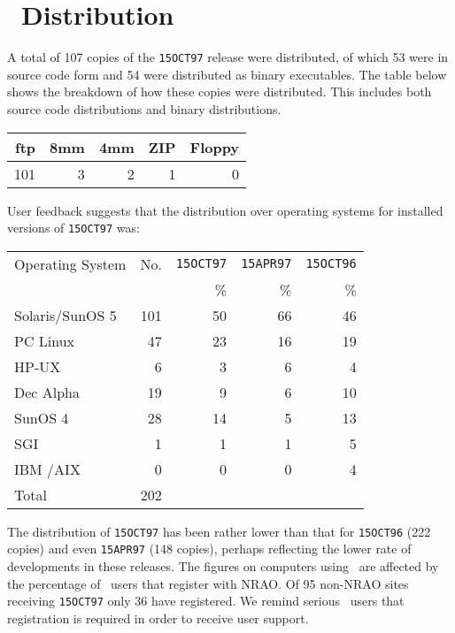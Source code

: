 \section{\AIPS\ Distribution}

A total of 107 copies of the \texttt{15OCT97} release were
distributed, of which 53 were in source code form and 54 were
distributed as binary executables.  The table below shows the
breakdown of how these copies were distributed. This includes both
source code distributions and binary distributions.

\begin{center}
\begin{tabular}{|r|r|r|r|r|} \hline\hline
{ftp} & {8mm} & {4mm} & {ZIP} & {Floppy} \\ \hline
101   &    3  &    2  &    1  &       0  \\ \hline\hline
\end{tabular}
\end{center}

User feedback suggests that the distribution over operating systems
for installed versions of \texttt{15OCT97} was:

\begin{center}
\begin{tabular}{|l|r|r|r|r|} \hline\hline
{Operating System} & {No.} & \texttt{15OCT97}  & \texttt{15APR97}  &
                                        \texttt{15OCT96}  \\
                   &       & {\%}   & {\%}   &  {\%}  \\ \hline
Solaris/SunOS 5 &    101   & 50 & 66 & 46  \\
PC Linux        &     47   & 23 & 16 & 19  \\
HP-UX           &      6   &  3 &  6 &  4  \\
Dec Alpha       &     19   &  9 &  6 & 10  \\
SunOS 4         &     28   & 14 &  5 & 13  \\
SGI             &      1   &  1 &  1 &  5  \\
IBM /AIX        &      0   &  0 &  0 &  4  \\
Total           &    202   &    &    &     \\ \hline\hline
\end{tabular}
\end{center}

The distribution of \texttt{15OCT97} has been rather lower than that
for {\tt 15OCT96} (222 copies) and even {\tt 15APR97} (148 copies),
perhaps reflecting the lower rate of developments in these releases.
The figures on computers using \AIPS\ are affected by the percentage
of \AIPS\ users that register with \hbox{NRAO}.  Of 95 non-NRAO sites
receiving {\tt 15OCT97} only 36 have registered.  We remind serious
\AIPS\ users that registration is required in order to receive user
support.

